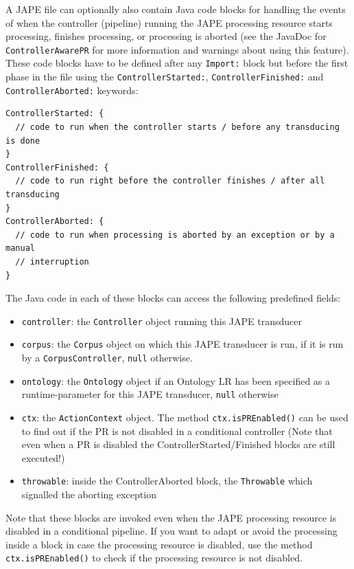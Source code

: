 A JAPE file can optionally also contain Java code blocks for handling 
the events of when the controller (pipeline) running the JAPE 
processing resource
starts processing, finishes processing, or processing is aborted 
(see the JavaDoc for \texttt{ControllerAwarePR} for more information and
warnings about using this feature). 
These code blocks have to be defined after any \texttt{Import:} block
but before the first phase in the file using the \texttt{ControllerStarted:},
 \texttt{ControllerFinished:} and \texttt{ControllerAborted:} keywords:

\begin{lstlisting}
ControllerStarted: {
  // code to run when the controller starts / before any transducing is done
}
ControllerFinished: {
  // code to run right before the controller finishes / after all transducing
}
ControllerAborted: {
  // code to run when processing is aborted by an exception or by a manual
  // interruption
}
\end{lstlisting}

The Java code in each of these blocks can access the following predefined 
fields:

\begin{itemize}
  \item{\verb!controller!:} the \texttt{Controller} object running this
     JAPE transducer
  \item{\verb!corpus!:} the \texttt{Corpus} object on which this JAPE 
     transducer is run, if it is run by a \texttt{CorpusController}, 
     \texttt{null} otherwise.
  \item{\verb!ontology!:} the \texttt{Ontology} object if an Ontology LR
     has been specified as a runtime-parameter for this JAPE transducer,
     \texttt{null} otherwise
  \item{\verb!ctx!:} the \texttt{ActionContext} object. The method 
    \verb!ctx.isPREnabled()! can be used to find out if the PR is not
    disabled in a conditional controller (Note that even when a PR is disabled
    the ControllerStarted/Finished blocks are still executed!) 
  \item{\verb!throwable!:} inside the ControllerAborted block, 
     the \texttt{Throwable}
     which signalled the aborting exception
\end{itemize}

Note that these blocks are invoked even when the JAPE processing resource is
disabled in a conditional pipeline. If you want to adapt or avoid the processing
inside a block in case the processing resource is disabled, use the method
\verb=ctx.isPREnabled()= to check if the processing resource is not disabled.

